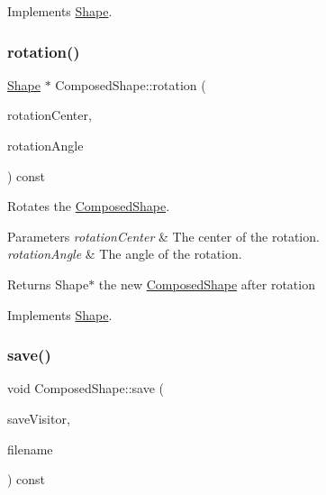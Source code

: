 Implements \hyperlink{class_shape_a0d74dcb2db0791b88b92f439bf4a6972}{Shape}.

\hypertarget{class_composed_shape_a9c4f0561d631b20c6cd56348d41a14dd}{}\label{class_composed_shape_a9c4f0561d631b20c6cd56348d41a14dd} 
\subsubsection{\texorpdfstring{rotation()}{rotation()}}
{\footnotesize\ttfamily \hyperlink{class_shape}{Shape} $\ast$ Composed\+Shape\+::rotation (\begin{DoxyParamCaption}\item[{const \hyperlink{class_vector2_d}{Vector2D} \&}]{rotation\+Center,  }\item[{const \hyperlink{class_radian_angle}{Radian\+Angle} \&}]{rotation\+Angle }\end{DoxyParamCaption}) const\hspace{0.3cm}{\ttfamily [virtual]}}

Rotates the \hyperlink{class_composed_shape}{Composed\+Shape}. 
\begin{DoxyParams}{Parameters}
{\em rotation\+Center} & The center of the rotation. \\
\hline
{\em rotation\+Angle} & The angle of the rotation. \\
\hline
\end{DoxyParams}
\begin{DoxyReturn}{Returns}
Shape$\ast$ the new \hyperlink{class_composed_shape}{Composed\+Shape} after rotation 
\end{DoxyReturn}


Implements \hyperlink{class_shape_abfc7a673b8a6d9a4d646dc15c771aa0d}{Shape}.

\hypertarget{class_composed_shape_af189684eb5328b2fc13c694d7e637ff8}{}\label{class_composed_shape_af189684eb5328b2fc13c694d7e637ff8} 
\subsubsection{\texorpdfstring{save()}{save()}}
{\footnotesize\ttfamily void Composed\+Shape\+::save (\begin{DoxyParamCaption}\item[{const \hyperlink{class_save_visitor}{Save\+Visitor} $\ast$}]{save\+Visitor,  }\item[{const string \&}]{filename }\end{DoxyParamCaption}) const\hspace{0.3cm}{\ttfamily [virtual]}}

